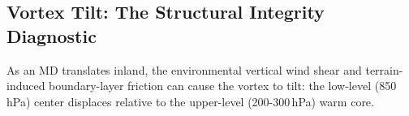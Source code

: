 %

\subsection{Vortex Tilt\texorpdfstring{:}{} The Structural Integrity Diagnostic}
\label{subsec:vortex_tilt_background}

As an MD translates inland, the environmental vertical wind shear and
terrain-induced boundary-layer friction can cause the vortex to tilt:
the low-level (850\,hPa) center displaces relative to the upper-level
(200-300\,hPa) warm core.

